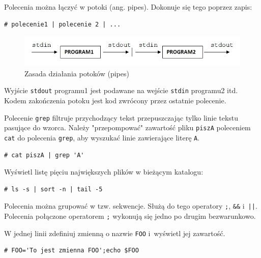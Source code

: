 \begin{example}
Polecenia można łączyć w potoki (ang. pipes). Dokonuje się tego poprzez zapis:

\begin{lstlisting}[style=MyBashStyle]
# polecenie1 | polecenie 2 | ...
\end{lstlisting}

\begin{figure}[!h]
\centering
\includegraphics[width=1.0\textwidth]{img/potoki}
\caption{Zasada działania potoków (pipes)}
\label{fig:potoki}
\end{figure}

Wyjście \lstinline[style=MyBashStyle]{stdout} programu1 jest podawane na wejście \lstinline[style=MyBashStyle]{stdin} programu2 itd. Kodem zakończenia potoku jest kod zwrócony przez ostatnie polecenie.

Polecenie \lstinline[style=MyBashStyle]{grep} filtruje przychodzący tekst przepuszczając tylko linie tekstu pasujące do wzorca. Należy "przepompować" zawartość pliku \lstinline[style=MyBashStyle]{piszA} poleceniem \lstinline[style=MyBashStyle]{cat} do polecenia \lstinline[style=MyBashStyle]{grep}, aby wyszukać linie zawierające literę \lstinline[style=MyBashStyle]{A}.

\begin{lstlisting}[style=MyBashStyle]
# cat piszA | grep 'A'
\end{lstlisting}

\end{example}

\begin{example}

Wyświetl listę pięciu największych plików w bieżącym katalogu:

\begin{lstlisting}[style=MyBashStyle]
# ls -s | sort -n | tail -5
\end{lstlisting}
\end{example}

\begin{example}

Polecenia można grupować w tzw. sekwencje. Służą do tego operatory \lstinline[style=MyBashStyle]{;}, \lstinline[style=MyBashStyle]{&&} i~\lstinline[style=MyBashStyle]{||}. Polecenia połączone operatorem \lstinline[style=MyBashStyle]{;} wykonują się jedno po drugim bezwarunkowo.

W jednej linii zdefiniuj zmienną o nazwie \lstinline[style=MyBashStyle]{FOO} i~wyświetl jej zawartość.

\begin{lstlisting}[style=MyBashStyle]
# FOO='To jest zmienna FOO';echo $FOO
\end{lstlisting}

\end{example}


